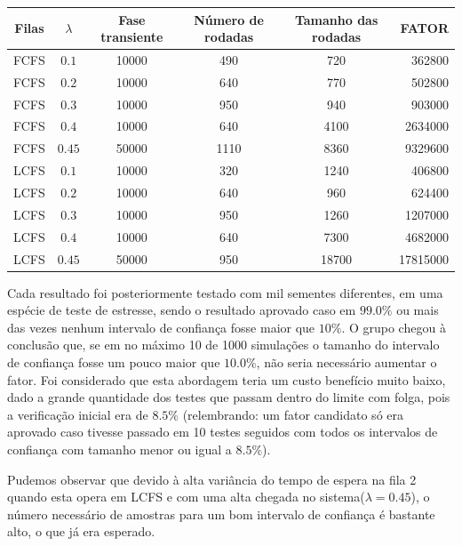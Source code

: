 \documentclass[a4paper,10pt]{article}
\begin{document}
\begin{center}
\begin{tabular} { | c | c | c | c | c | r | }
    \hline
    Filas & $\lambda$  & Fase transiente  & Número de rodadas & Tamanho das rodadas  & FATOR \\ \hline
    FCFS     & $0.1$   & 10000 & 490     & 720      & 362800       \\ \hline
    FCFS     & $0.2$   & 10000 & 640     & 770      & 502800       \\ \hline
    FCFS     & $0.3$   & 10000 & 950     & 940      & 903000       \\ \hline
    FCFS     & $0.4$   & 10000 & 640     & 4100    & 2634000     \\ \hline
    FCFS     & $0.45$ & 50000 & 1110   & 8360    & 9329600     \\ \hline
    LCFS     & $0.1$   & 10000 & 320     & 1240    & 406800       \\ \hline
    LCFS     & $0.2$   & 10000 & 640     & 960      & 624400       \\ \hline
    LCFS     & $0.3$   & 10000 & 950     & 1260    & 1207000     \\ \hline
    LCFS     & $0.4$   & 10000 & 640     & 7300    & 4682000     \\ \hline
    LCFS     & $0.45$ & 50000 & 950     & 18700  & 17815000   \\ \hline
\end{tabular}
\end{center}


Cada resultado foi  posteriormente testado com mil sementes diferentes, em uma espécie de teste de estresse, sendo o resultado aprovado caso em $99.0\%$ ou mais das vezes nenhum intervalo de confiança fosse maior que $10\%$. O grupo chegou à conclusão que, se em no máximo 10 de 1000 simulações o tamanho do intervalo de confiança fosse um pouco maior que $10.0\%$, não seria necessário aumentar o fator. Foi considerado que esta abordagem teria um custo benefício muito baixo, dado a grande quantidade dos testes que passam dentro do limite com folga, pois a verificação inicial era de $8.5\%$ (relembrando: um fator candidato só era aprovado caso tivesse passado em 10 testes seguidos com todos os intervalos de confiança com tamanho menor ou igual a $8.5\%$).

Pudemos observar que devido à alta variância do tempo de espera na fila 2 quando esta opera em LCFS e com uma alta chegada no sistema($\lambda = 0.45$), o número necessário de amostras para um bom intervalo de confiança é bastante alto, o que já era esperado.
\end{document}
